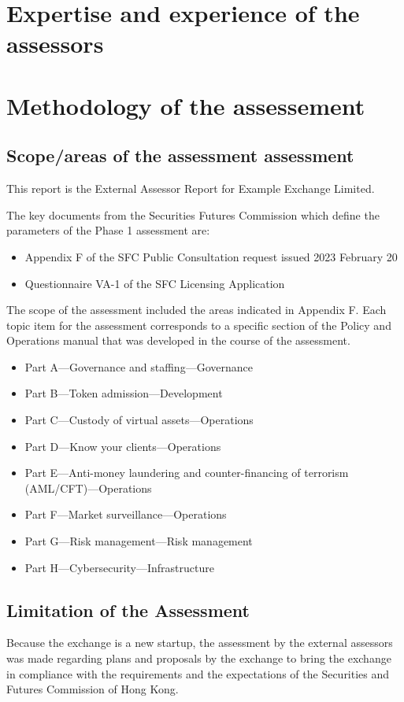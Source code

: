 \documentclass[]{report}
\def\firmfullname{Example Exchange Limited}
\begin{document}
\chapter{Expertise and experience of the assessors}


\chapter{Methodology of the assessement}
\section{Scope/areas of the assessment assessment}

This report is the External Assessor Report for \firmfullname.  

The key documents from the Securities Futures Commission which define
the parameters of the Phase 1 assessment are:

\begin{itemize}
  \item Appendix F of the SFC Public Consultation request issued
    2023 February 20
  \item Questionnaire VA-1 of the SFC Licensing Application
\end{itemize}

The scope of the assessment included the areas indicated in Appendix
F.  Each topic item for the assessment corresponds to a specific
section of the Policy and Operations manual that was developed in the
course of the assessment.

\begin{itemize}
\item Part A—Governance and staffing—Governance
\item Part B—Token admission—Development
\item Part C—Custody of virtual assets—Operations
\item Part D—Know your clients—Operations
\item Part E—Anti-money laundering and counter-financing of
  terrorism (AML/CFT)—Operations
\item Part F—Market surveillance—Operations
\item Part G—Risk management—Risk management
\item Part H—Cybersecurity—Infrastructure
\end{itemize}


\section{Limitation of the Assessment}
Because the exchange is a new startup, the assessment by the external
assessors was made regarding plans and proposals by the
exchange to bring the exchange in compliance with the
requirements and the expectations of the Securities and Futures
Commission of Hong Kong.
\end{document}
